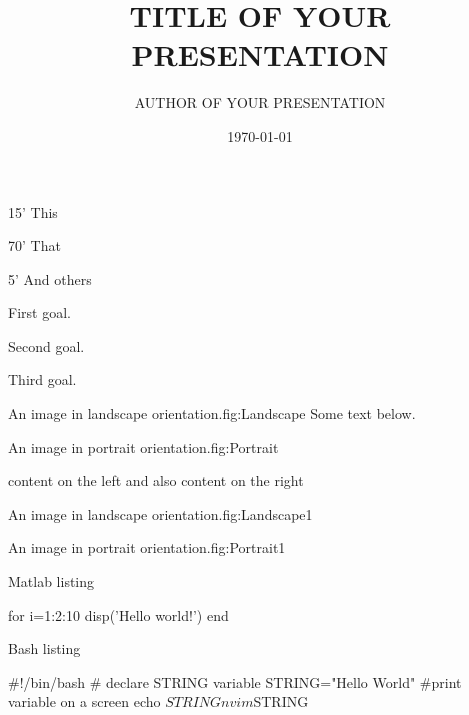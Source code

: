 \documentclass[usenames,dvipsnames]{beamer}
\title{TITLE OF YOUR PRESENTATION}
\author{AUTHOR OF YOUR PRESENTATION}
\date{\today}
\begin{document}
\maketitle

\begin{TFTimeSchedule}
\item 15' This
\item 70' That
\item 5'  And others
\end{TFTimeSchedule}

\begin{TFLearningObjectives}
\item First goal.
\item Second goal.
\item Third goal.
\end{TFLearningObjectives}

\begin{TFPicture}[Landscape]{An image in landscape orientation.}{fig:Landscape}
Some text below.
\end{TFPicture}

\begin{TFPicture}[Portrait]{An image in portrait orientation.}{fig:Portrait}
\end{TFPicture}

\begin{TFTwoColumns}[Title]
{content on the left}
{and also content on the right}
\end{TFTwoColumns}

\begin{TFTwoColumns}[Title]
{
\begin{TPPicture}[Landscape]{An image in landscape orientation.}{fig:Landscape1}
\end{TPPicture}
}
{
\begin{TPPicture}[Portrait]{An image in portrait orientation.}{fig:Portrait1}
\end{TPPicture}
}
\end{TFTwoColumns}

\begin{frame}[fragile]{Matlab listing}
\begin{TFMatlab}
for i=1:2:10
    disp('Hello world!')
end
\end{TFMatlab}
\end{frame}

\begin{frame}[fragile]{Bash listing}
\begin{TFBash}
#!/bin/bash
# declare STRING variable
STRING="Hello World"
#print variable on a screen
echo $STRING
nvim $STRING
\end{TFBash}
\end{frame}
\end{document}
